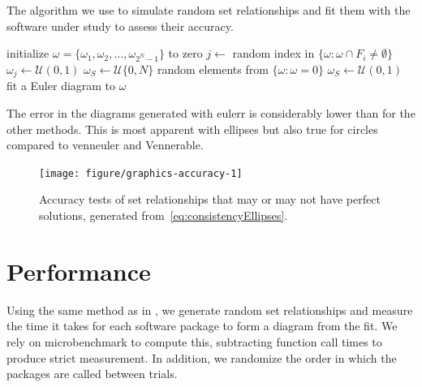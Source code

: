 \documentclass[
  a4paper,
  nofonts,
  nobib,
  nohyper,
  openany
]{tufte-book}\usepackage[]{graphicx}\usepackage[]{color}
\newenvironment{knitrout}{}{} %
\newcommand{\pkg}[1]{{\fontseries{b}\selectfont #1}}
\begin{document}
\begin{algorithm}[htb]
\caption{The algorithm we use to simulate random set relationships and fit them with the software under study to assess their accuracy.}
\label{alg:accuracy}
\begin{algorithmic}[1]

  \STATE initialize $\omega = \{\omega_1,\omega_2,\dots,\omega_{2^N-1} \}$ to zero
    \STATE $j \leftarrow$ random index in $\{\omega : \omega \cap F_i \neq \emptyset\}$
    \STATE $\omega_j \leftarrow \mathcal{U}(0, 1)$
  \ENDFOR
  \STATE $\omega_S \leftarrow \mathcal{U}\{0, N\}$ random elements from $\{\omega : \omega = 0\}$
  \STATE $\omega_S \leftarrow \mathcal{U}(0, 1)$
  \STATE fit a Euler diagram to $\omega$
\ENDFOR
\end{algorithmic}
\end{algorithm}

The error in the diagrams generated with \pkg{eulerr} is considerably lower than for the other methods. This is most apparent with ellipses but also true for circles compared to \pkg{venneuler} and \pkg{Vennerable}.

\begin{figure}[hbt]
\begin{knitrout}
\color{fgcolor}

{\centering \texttt{[image: figure/graphics-accuracy-1]} 

}



\end{knitrout}
\caption{Accuracy tests of set relationships that may or may not have perfect solutions, generated from~\eqref{eq:consistencyEllipses}.}
\label{fig:accuracy}
\end{figure}

\section{Performance}
\label{sec:performance}

Using the same method as in , we generate random set relationships and measure the time it takes for each software package to form a diagram from the fit. We rely on \pkg{microbenchmark} to compute this, subtracting function call times to produce strict measurement. In addition, we randomize the order in which the packages are called between trials.
\end{document}
